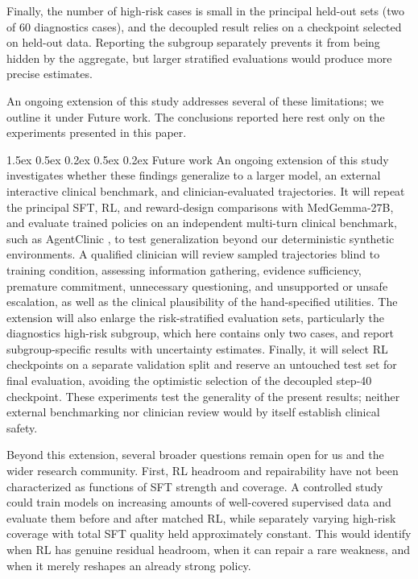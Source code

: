 \documentclass{article}
\makeatletter
\renewcommand{\paragraph}{%
  \@startsection{paragraph}{4}{\z@}%
                {1.5ex \@plus 0.5ex \@minus 0.2ex}%
                {0.5ex \@plus 0.2ex}%
                {\normalsize\bf}}
\makeatother
\begin{document}
Finally, the number of high-risk cases is small in the principal held-out sets (two
of 60 diagnostics cases), and the decoupled result relies on a checkpoint selected on
held-out data.
Reporting the subgroup separately prevents it from being hidden by the aggregate,
but larger stratified evaluations would produce more precise estimates.

An ongoing extension of this study addresses several of these limitations; we
outline it under Future work. The conclusions reported here rest only on the
experiments presented in this paper.

\paragraph{Future work}
An ongoing extension of this study investigates whether these findings generalize
to a larger model, an external interactive clinical benchmark, and
clinician-evaluated trajectories. It will repeat the principal SFT, RL, and
reward-design comparisons with MedGemma-27B, and evaluate trained policies on an
independent multi-turn clinical benchmark, such as AgentClinic
\citep{schmidgall2026agentclinic}, to test generalization beyond our
deterministic synthetic environments. A qualified clinician will review sampled
trajectories blind to training condition, assessing information gathering,
evidence sufficiency, premature commitment, unnecessary questioning, and
unsupported or unsafe escalation, as well as the clinical plausibility of the
hand-specified utilities. The extension will also enlarge the risk-stratified
evaluation sets, particularly the diagnostics high-risk subgroup, which here
contains only two cases, and report subgroup-specific results with uncertainty
estimates. Finally, it will select RL checkpoints on a separate validation split
and reserve an untouched test set for final evaluation, avoiding the optimistic
selection of the decoupled step-40 checkpoint. These experiments test the
generality of the present results; neither external benchmarking nor clinician
review would by itself establish clinical safety.

Beyond this extension, several broader questions remain open for us and the wider
research community. First, RL headroom
and repairability have not been characterized as functions of SFT strength and
coverage. A controlled study could train models on increasing amounts of
well-covered supervised data and evaluate them before and after matched RL, while
separately varying high-risk coverage with total SFT quality held approximately
constant. This would identify when RL has genuine residual headroom, when it can
repair a rare weakness, and when it merely reshapes an already strong policy.
\end{document}
